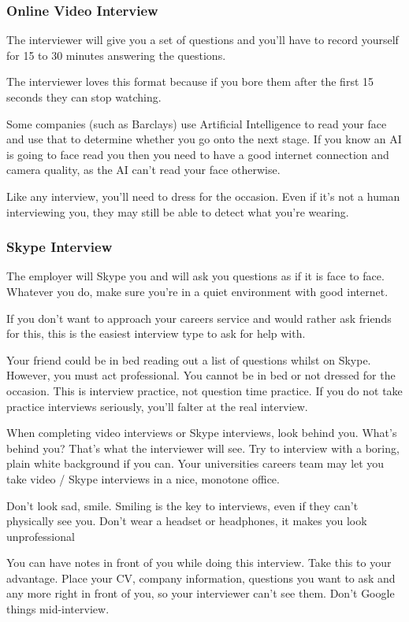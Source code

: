 \documentclass{article}
\begin{document}
\subsubsection{Online Video Interview}
The interviewer will give you a set of questions and you'll have to
record yourself for 15 to 30 minutes answering the questions.

The interviewer loves this format because if you bore them after the
first 15 seconds they can stop watching.

Some companies (such as Barclays) use Artificial Intelligence to read
your face and use that to determine whether you go onto the next stage.
If you know an AI is going to face read you then you need to have a good
internet connection and camera quality, as the AI can't read your face
otherwise.

Like any interview, you'll need to dress for the occasion. Even if it's
not a human interviewing you, they may still be able to detect what
you're wearing.
\subsubsection{Skype Interview}
The employer will Skype you and will ask you questions as if it is face
to face. Whatever you do, make sure you're in a quiet environment with
good internet.

If you don't want to approach your careers service and would rather ask
friends for this, this is the easiest interview type to ask for help
with.

Your friend could be in bed reading out a list of questions whilst on
Skype. However, you must act professional. You cannot be in bed or not
dressed for the occasion. This is interview practice, not question time
practice. If you do not take practice interviews seriously, you'll
falter at the real interview.

When completing video interviews or Skype interviews, look behind you.
What's behind you? That's what the interviewer will see. Try to
interview with a boring, plain white background if you can. Your
universities careers team may let you take video / Skype interviews in a
nice, monotone office.

Don't look sad, smile. Smiling is the key to interviews, even if they
can't physically see you. Don't wear a headset or headphones, it makes
you look unprofessional

You can have notes in front of you while doing this interview. Take this
to your advantage. Place your CV, company information, questions you
want to ask and any more right in front of you, so your interviewer
can't see them. Don't Google things mid-interview.
\end{document}
